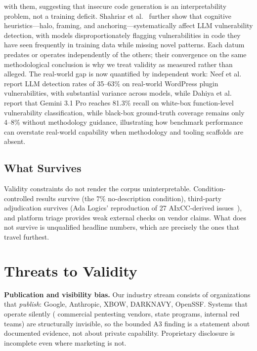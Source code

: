 \documentclass[conference,compsoc]{IEEEtran}
\begin{document}
with them, suggesting that insecure code generation is an interpretability problem,
not a training deficit. Shahriar et
al.~\cite{wordsspeaklouder2026} further show that cognitive heuristics---halo, framing,
and anchoring---systematically affect LLM vulnerability
 detection, with models disproportionately flagging vulnerabilities in code they have seen
 frequently in training data while missing novel patterns. Each datum predates or
 operates independently of the others; their convergence on the same methodological conclusion
 is why we treat validity as measured rather than alleged. The real-world gap is now quantified
 by independent work: Neef et al.~\cite{webvulndetect2026} report LLM detection rates of
 35--63\% on real-world WordPress plugin vulnerabilities, with substantial variance across
 models, while Dahiya et al.~\cite{frontierllmsready2026} report that Gemini 3.1 Pro reaches
 81.3\% recall on white-box function-level vulnerability classification, while black-box
 ground-truth coverage remains only 4--8\% without methodology guidance, illustrating how
 benchmark performance can overstate real-world capability when methodology and tooling
 scaffolds are absent.

\subsection{What Survives}
Validity constraints do not render the corpus uninterpretable. Condition-controlled results
survive (the 7\% no-description condition), third-party adjudication survives (Ada Logics'
reproduction of 27 AIxCC-derived issues~\cite{openssfaixcc2026}), and platform triage provides
weak external checks on vendor claims. What does not survive is unqualified headline numbers, 
which are precisely the ones that travel furthest.

\vspace{6pt}
\section{Threats to Validity}
\label{sec:threats}

\textbf{Publication and visibility bias.} Our industry stream consists of organizations that
\emph{publish}: Google, Anthropic, XBOW, DARKNAVY, OpenSSF. Systems that operate silently (
commercial pentesting vendors, state programs, internal red teams) are structurally
invisible, so the bounded A3 finding is a statement about documented evidence, not about private
capability. Proprietary disclosure is incomplete even where marketing is not.
\end{document}
